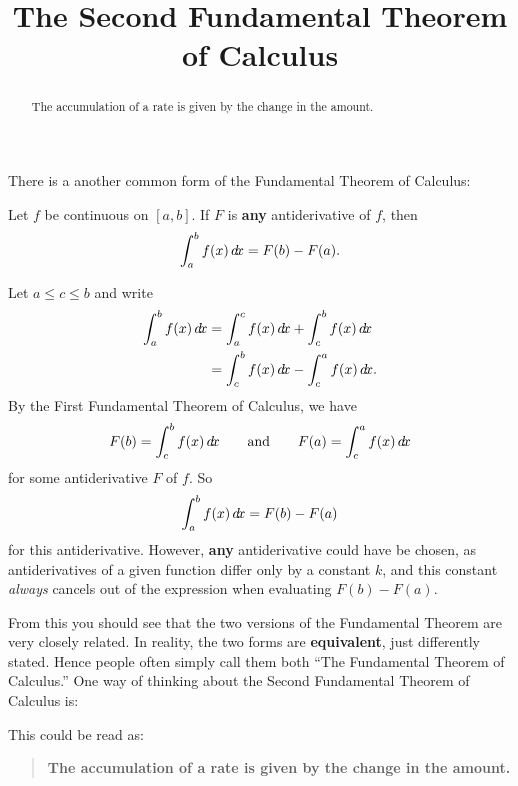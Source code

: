 \documentclass{ximera}
\title[Dig-In:]{The Second Fundamental Theorem of Calculus}
\begin{document}
\begin{abstract}
The accumulation of a rate is given by the change in the amount.
\end{abstract}
\maketitle




There is a another common form of the Fundamental Theorem of Calculus:

\begin{theorem}
  Let $f$ be continuous on $[a,b]$. If $F$ is \textbf{any}
  antiderivative of $f$, then
  \[
  \int_a^b f(x)\mathop{}\!d\! x = F(b)-F(a).
  \]
  \begin{explanation}
    Let $a\le c\le b$ and write
    \begin{align*}
      \int_a^b f(x) \d x &= \int_a^c f(x) \d x + \int_c^b f(x) \d x \\
      &= \int_c^b f(x) \d x - \int_c^a f(x) \d x.
    \end{align*}
    By the First Fundamental Theorem of Calculus, we have
    \[
    F(b) = \int_c^b f(x) \mathop{}\!d\! x\qquad\text{and}\qquad F(a) = \int_c^a f(x) \mathop{}\!d\! x
    \] 
    for some antiderivative $F$ of $f$. So
    \[
    \int_a^b f(x) \mathop{}\!d\! x = F(b)-F(a)
    \]
    for this antiderivative. However, \textbf{any} antiderivative
    could have be chosen, as antiderivatives of a given function
    differ only by a constant $k$, and this constant \textit{always}
    cancels out of the expression when evaluating $F(b)-F(a)$.
\end{explanation}
\end{theorem}

From this you should see that the two versions of the Fundamental
Theorem are very closely related. In reality, the two forms are
\textbf{equivalent}, just differently stated. Hence people often
simply call them both ``The Fundamental Theorem of Calculus.''
One way of thinking about the Second Fundamental Theorem of Calculus is:
\begin{center}
\end{center}
This could be read as:%
\begin{quote}\large\textbf{The \textcolor{green!70!black!70!blue}{accumulation} of a \textcolor{blue!70!green}{rate} is given by the \textcolor{purple!50!blue!90!black}{change in the amount}.}
\end{quote}
\end{document}
